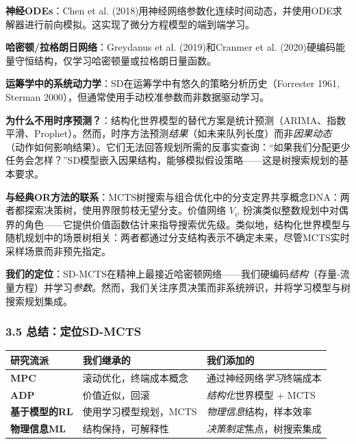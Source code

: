\documentclass[UTF8]{ctexart}
\begin{document}
\textbf{神经ODEs}：Chen et al.
(2018)用神经网络参数化连续时间动态，并使用ODE求解器进行前向模拟。这实现了微分方程模型的端到端学习。

\textbf{哈密顿/拉格朗日网络}：Greydanus et al. (2019)和Cranmer et al.
(2020)硬编码能量守恒结构，仅学习哈密顿量或拉格朗日量函数。

\textbf{运筹学中的系统动力学}：SD在运筹学中有悠久的策略分析历史（Forrester
1961, Sterman 2000），但通常使用手动校准参数而非数据驱动学习。

\textbf{为什么不用时序预测？}：结构化世界模型的替代方案是统计预测（ARIMA、指数平滑、Prophet）。然而，时序方法预测\emph{结果}（如未来队列长度）而非\emph{因果动态}（动作如何影响结果）。它们无法回答规划所需的反事实查询：``如果我们分配更少任务会怎样？''SD模型嵌入因果结构，能够模拟假设策略------这是树搜索规划的基本要求。

\textbf{与经典OR方法的联系}：MCTS树搜索与组合优化中的分支定界共享概念DNA：两者都探索决策树，使用界限剪枝无望分支。价值网络
\(V_\psi\)
扮演类似整数规划中对偶界的角色------它提供价值函数估计来指导搜索优先级。类似地，结构化世界模型与随机规划中的场景树相关：两者都通过分支结构表示不确定未来，尽管MCTS实时采样场景而非预先指定。

\textbf{我们的定位}：SD-MCTS在精神上最接近哈密顿网络------我们硬编码\emph{结构}（存量-流量方程）并学习\emph{参数}。然而，我们关注序贯决策而非系统辨识，并将学习模型与树搜索规划集成。

\hypertarget{ux603bux7ed3ux5b9aux4f4dsd-mcts}{%
\subsubsection{3.5
总结：定位SD-MCTS}\label{ux603bux7ed3ux5b9aux4f4dsd-mcts}}

\begin{table}[h]
\centering
\begin{tabular}{p{4cm}p{5cm}p{5cm}}
\toprule
\textbf{研究流派} & \textbf{我们继承的} & \textbf{我们添加的} \\
\midrule
\textbf{MPC} & 滚动优化，终端成本概念 & 通过神经网络\emph{学习}终端成本 \\
\textbf{ADP} & 价值近似，回滚 & \emph{结构化}世界模型 + MCTS \\
\textbf{基于模型的RL} & 使用学习模型规划，MCTS & \emph{物理信息}结构，样本效率 \\
\textbf{物理信息ML} & 结构保持，可解释性 & \emph{决策制定}焦点，树搜索集成 \\
\bottomrule
\end{tabular}
\end{table}
\end{document}
